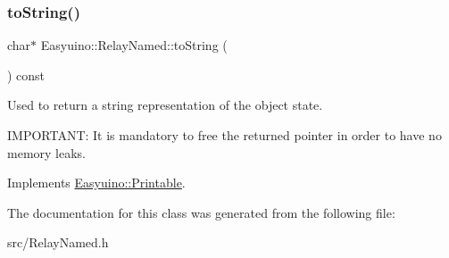 \subsubsection{\texorpdfstring{to\+String()}{toString()}}
{\footnotesize\ttfamily char$\ast$ Easyuino\+::\+Relay\+Named\+::to\+String (\begin{DoxyParamCaption}{ }\end{DoxyParamCaption}) const\hspace{0.3cm}{\ttfamily [virtual]}}



Used to return a string representation of the object state. 

I\+M\+P\+O\+R\+T\+A\+NT\+: It is mandatory to free the returned pointer in order to have no memory leaks. 

Implements \hyperlink{class_easyuino_1_1_printable_a49ae1c60dc0404600ee122c6c2684155}{Easyuino\+::\+Printable}.



The documentation for this class was generated from the following file\+:\begin{DoxyCompactItemize}
\item 
src/Relay\+Named.\+h\end{DoxyCompactItemize}
